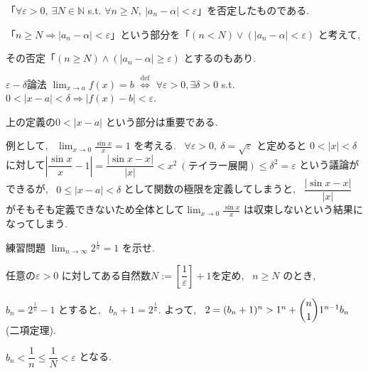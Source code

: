 \documentclass[10pt]{jsarticle}
\begin{document}
「$\forall \varepsilon > 0, \ \exists N \in \mathbb{N}$ s.t.
  $\forall n \ge N, \ |a_n - \alpha| < \varepsilon$」を否定したものである.

  「$n \ge N \Longrightarrow |a_n - \alpha| < \varepsilon$」という部分を「$(n < N) \lor (|a_n - \alpha| < \varepsilon)$ と考えて, 
  
  その否定「$(n \ge N) \land (|a_n - \alpha| \ge \varepsilon)$ とするのもあり.

\bigskip
\bigskip

\begin{itembox}[l]{$\varepsilon-\delta$論法}
  $\displaystyle \lim_{x \to a} f(x) = b$
    $\overset{\mathrm{def}}{\iff}$
    $\forall \varepsilon > 0, \exists \delta > 0$ s.t. $0 < |x - a| < \delta \Longrightarrow |f(x) - b| < \varepsilon$.
\end{itembox}

上の定義の$0 < |x - a|$ という部分は重要である.

例として, \ $\displaystyle \lim_{x \to 0} \frac{\sin x}{x} = 1$ を考える. \ $\forall \varepsilon > 0, \ \delta = \sqrt{\varepsilon}$ と定めると $0 < |x| < \delta$ に対して$\left| \dfrac{\sin x}{x} - 1 \right| = \dfrac{|\sin x - x|}{|x|} < x^2 \ (テイラー展開) \le \delta^2 = \varepsilon$ という議論ができるが, \ $0 \le |x-a| < \delta$ として関数の極限を定義してしまうと, \ $\dfrac{|\sin x - x|}{|x|}$ がそもそも定義できないため全体として$\displaystyle \lim_{x \to 0} \frac{\sin x}{x}$ は収束しないという結果になってしまう.

\bigskip
\bigskip

\begin{itembox}[l]{練習問題}
  $\displaystyle \lim_{n \to \infty} 2^{\frac{1}{n}} = 1$ を示せ.
\end{itembox}

任意の$\varepsilon > 0$ に対してある自然数$N := \left[\dfrac{1}{\varepsilon} \right] + 1$を定め, \ $n \ge N$ のとき,

$b_n = 2^{\frac{1}{n}} - 1$ とすると, \ $b_n + 1 = 2^{\frac{1}{n}}$.
よって, \ $2 = (b_n + 1)^n > 1^n + \dbinom{n}{1} 1^{n-1}b_n$ (二項定理).

$b_n < \dfrac{1}{n} \le \dfrac{1}{N} < \varepsilon$ となる.
\end{document}
